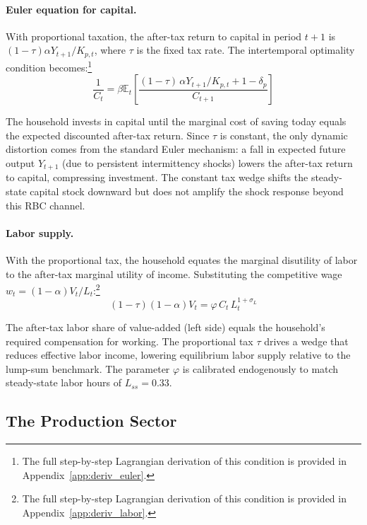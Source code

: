 \documentclass[12pt, a4paper]{article}
\begin{document}
\paragraph{Euler equation for capital.} With proportional taxation, the after-tax return to capital in period $t+1$ is $(1-\tau)\alpha Y_{t+1}/K_{p,t}$, where $\tau$ is the fixed tax rate. The intertemporal optimality condition becomes:\footnote{The full step-by-step Lagrangian derivation of this condition is provided in Appendix~\ref{app:deriv_euler}.}
\begin{equation}
\frac{1}{C_t} = \beta \mathbb{E}_t \left[ \frac{(1-\tau)\,\alpha Y_{t+1}/K_{p,t} + 1 - \delta_p}{C_{t+1}} \right]
\label{eq:euler}
\end{equation}

The household invests in capital until the marginal cost of saving today equals the expected discounted after-tax return. Since $\tau$ is constant, the only dynamic distortion comes from the standard Euler mechanism: a fall in expected future output $Y_{t+1}$ (due to persistent intermittency shocks) lowers the after-tax return to capital, compressing investment. The constant tax wedge shifts the steady-state capital stock downward but does not amplify the shock response beyond this RBC channel.

\paragraph{Labor supply.} With the proportional tax, the household equates the marginal disutility of labor to the after-tax marginal utility of income. Substituting the competitive wage $w_t = (1-\alpha)V_t/L_t$:\footnote{The full step-by-step Lagrangian derivation of this condition is provided in Appendix~\ref{app:deriv_labor}.}
\begin{equation}
(1-\tau)(1-\alpha) V_t = \varphi \, C_t \, L_t^{1+\sigma_L}
\label{eq:labor_supply}
\end{equation}

The after-tax labor share of value-added (left side) equals the household's required compensation for working. The proportional tax $\tau$ drives a wedge that reduces effective labor income, lowering equilibrium labor supply relative to the lump-sum benchmark. The parameter $\varphi$ is calibrated endogenously to match steady-state labor hours of $L_{ss} = 0.33$.

\subsection{The Production Sector}
\end{document}

